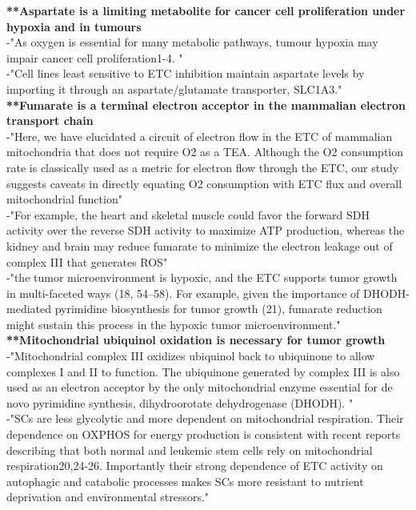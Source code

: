 \documentclass[11pt,a4paper]{article}
\begin{document}
\textbf{**Aspartate is a limiting metabolite for cancer cell proliferation under hypoxia and in tumours }\\

-"As oxygen is essential for many metabolic pathways, tumour hypoxia may impair cancer cell proliferation1-4. "\\

-"Cell lines least sensitive to ETC inhibition maintain aspartate levels by importing it through an aspartate/glutamate transporter, SLC1A3."\\

\textbf{**Fumarate is a terminal electron acceptor in the mammalian electron transport chain}\\

-"Here, we have elucidated a circuit of electron flow in the ETC of mammalian mitochondria that does not require O2 as a TEA. Although the O2 consumption rate is classically used as a metric for electron flow through the ETC, our study suggests caveats in directly equating O2 consumption with ETC flux and overall mitochondrial function"\\

-"For example, the heart and skeletal muscle could favor the forward SDH activity over the reverse SDH activity to maximize ATP production, whereas the kidney and brain may reduce fumarate to minimize the electron leakage out of complex III that generates ROS"\\

-"the tumor microenvironment is hypoxic, and the ETC supports tumor growth in multi-faceted ways (18, 54–58). For example, given the importance of DHODH-mediated pyrimidine biosynthesis for tumor growth (21), fumarate reduction might sustain this process in the hypoxic tumor microenvironment."\\

\textbf{**Mitochondrial ubiquinol oxidation is necessary for tumor growth} \\

-"Mitochondrial complex III oxidizes ubiquinol back to ubiquinone to allow complexes I and II to function. The ubiquinone generated by complex III is also used as an electron acceptor by the only mitochondrial enzyme essential for de novo pyrimidine synthesis, dihydroorotate dehydrogenase (DHODH). "\\


-"SCs are less glycolytic and more dependent on mitochondrial respiration. Their dependence on OXPHOS for energy production is consistent with recent reports describing that both normal and leukemic stem cells rely on mitochondrial respiration20,24-26. Importantly their strong dependence of ETC activity on autophagic and catabolic processes makes SCs more resistant to nutrient deprivation and environmental stressors."\\
\end{document}
